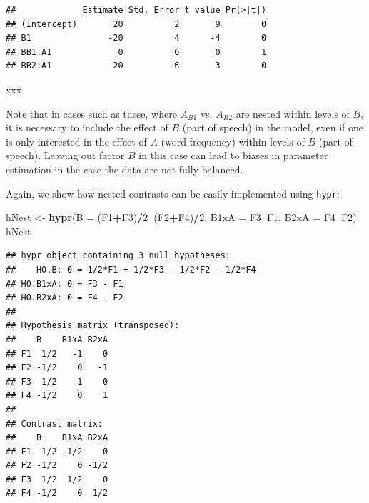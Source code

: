 \documentclass[12pt,]{krantz}
\newenvironment{Shaded}{\begin{snugshade}}{\end{snugshade}}
\newcommand{\DataTypeTok}[1]{\textcolor[rgb]{0.13,0.29,0.53}{#1}}
\newcommand{\DecValTok}[1]{\textcolor[rgb]{0.00,0.00,0.81}{#1}}
\newcommand{\KeywordTok}[1]{\textcolor[rgb]{0.13,0.29,0.53}{\textbf{#1}}}
\newcommand{\NormalTok}[1]{#1}
\newcommand{\OperatorTok}[1]{\textcolor[rgb]{0.81,0.36,0.00}{\textbf{#1}}}
\newcommand{\StringTok}[1]{\textcolor[rgb]{0.31,0.60,0.02}{#1}}
\begin{document}
\begin{Shaded}
\end{Shaded}

\begin{verbatim}
##             Estimate Std. Error t value Pr(>|t|)
## (Intercept)       20          2       9        0
## B1               -20          4      -4        0
## BB1:A1             0          6       0        1
## BB2:A1            20          6       3        0
\end{verbatim}

xxx

Note that in cases such as these, where \(A_{B1}\) vs. \(A_{B2}\) are nested within levels of \(B\), it is necessary to include the effect of \(B\) (part of speech) in the model, even if one is only interested in the effect of \(A\) (word frequency) within levels of \(B\) (part of speech). Leaving out factor \(B\) in this case can lead to biases in parameter estimation in the case the data are not fully balanced.

Again, we show how nested contrasts can be easily implemented using \texttt{hypr}:

\begin{Shaded}
\begin{Highlighting}[]
\NormalTok{hNest <-}\StringTok{ }\KeywordTok{hypr}\NormalTok{(}\DataTypeTok{B    =}\NormalTok{ (F1}\OperatorTok{+}\NormalTok{F3)}\OperatorTok{/}\DecValTok{2}\OperatorTok{~}\NormalTok{(F2}\OperatorTok{+}\NormalTok{F4)}\OperatorTok{/}\DecValTok{2}\NormalTok{,}
              \DataTypeTok{B1xA =}\NormalTok{ F3}\OperatorTok{~}\NormalTok{F1,}
              \DataTypeTok{B2xA =}\NormalTok{ F4}\OperatorTok{~}\NormalTok{F2)}
\NormalTok{hNest}
\end{Highlighting}
\end{Shaded}

\begin{verbatim}
## hypr object containing 3 null hypotheses:
##    H0.B: 0 = 1/2*F1 + 1/2*F3 - 1/2*F2 - 1/2*F4
## H0.B1xA: 0 = F3 - F1
## H0.B2xA: 0 = F4 - F2
## 
## Hypothesis matrix (transposed):
##    B    B1xA B2xA
## F1  1/2   -1    0
## F2 -1/2    0   -1
## F3  1/2    1    0
## F4 -1/2    0    1
## 
## Contrast matrix:
##    B    B1xA B2xA
## F1  1/2 -1/2    0
## F2 -1/2    0 -1/2
## F3  1/2  1/2    0
## F4 -1/2    0  1/2
\end{verbatim}
\end{document}
